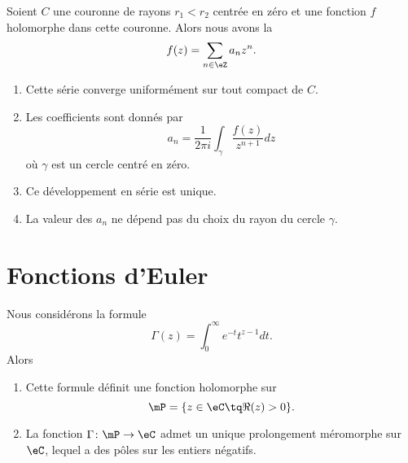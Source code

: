 \begin{theorem}       \label{THOooMKJOooVghZyG}
    Soient \( C\) une couronne de rayons \( r_1<r_2\) centrée en zéro et une fonction \( f\) holomorphe dans cette couronne. Alors nous avons la 
    \begin{equation}
        f(z)=\sum_{n\in \eZ}a_nz^n.
    \end{equation}
    \begin{enumerate}
        \item
            Cette série converge uniformément sur tout compact de \( C\).
        \item
            Les coefficients sont donnés par
            \begin{equation}
                a_n=\frac{1}{ 2\pi i }\int_{\gamma}\frac{ f(z) }{ z^{n+1} }dz
            \end{equation}
            où \( \gamma\) est un cercle centré en zéro.
        \item
            Ce développement en série est unique.
        \item
            La valeur des \( a_n\) ne dépend pas du choix du rayon du cercle \( \gamma\).
    \end{enumerate}
\end{theorem}

\section{Fonctions d'Euler}

\begin{theorem}   \label{ThoZJYooWKfbVz}
    Nous considérons la formule
    \begin{equation}
        \Gamma(z)=\int_0^{\infty} e^{-t}t^{z-1}dt.
    \end{equation}
    Alors
    \begin{enumerate}
        \item
            Cette formule définit une fonction holomorphe sur 
            \begin{equation}
                \mP=\{ z\in \eC\tq \Re(z)>0 \}.
            \end{equation}
        \item
            La fonction \( \Gamma\colon \mP\to \eC\) admet un unique prolongement méromorphe sur \( \eC\), lequel a des pôles sur les entiers négatifs.
    \end{enumerate}
\end{theorem}

